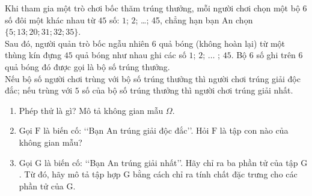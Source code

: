 \begin{vd}%
	Khi tham gia một trò chơi bốc thăm trúng thưởng, mỗi người chơi chọn một bộ $ 6 $ số đôi một khác nhau từ $ 45 $ số: $ 1 $; $ 2 $; \ldots ; 45, chẳng hạn bạn An chọn $ \{5; 13; 20; 31; 32; 35\} $.\\
	Sau đó, người quản trò  bốc ngẫu nhiên $ 6 $ quả bóng (không hoàn lại) từ một thùng kín đựng $ 45 $ quả bóng như nhau ghi các số $ 1 $; $ 2 $; $\ldots$ ; $ 45 $. Bộ $ 6 $ số ghi trên $ 6 $ quả bóng đó được gọi là bộ số trúng thưởng.\\
	Nếu bộ số người chơi trùng với bộ số trúng thưởng thì người chơi trúng giải độc đắc; nếu trùng với $ 5 $ số của bộ số trúng thưởng thì người chơi trúng giải nhất.
	\begin{enumerate}
		\item Phép thử là gì? Mô tả không gian mẫu $ \Omega $.
		\item Gọi $ \mathrm{F} $ là biến cố: \lq\lq  Bạn An trúng giải độc đắc\rq\rq. Hỏi $ \mathrm{F} $ là tập con nào của không gian mẫu?
		 \item Gọi $ \mathrm{G} $ là biến cố: \lq\lq  Bạn An trúng giải nhất\rq\rq. Hãy chỉ ra ba phần tử của tập $ \mathrm{G} $. Từ đó, hãy mô tả tập hợp $ \mathrm{G} $ bằng cách chỉ ra tính chất đặc trưng cho các phần tử của $ \mathrm{G} $.
	\end{enumerate}
\end{vd}


